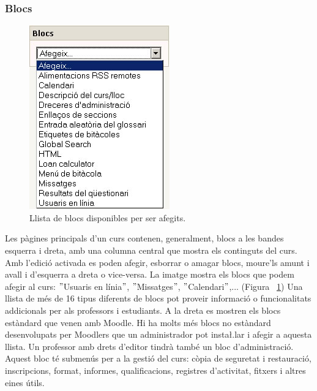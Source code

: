 \documentclass[a4paper]{report}  %
\begin{document}
\subsubsection{Blocs}
\begin{figure}[H] %
\begin{flushleft}
\includegraphics{img/MoodleBloc.jpg}
\caption[List caption]{Llista de blocs disponibles per ser afegits.} 
\label{fig:MoodleBloc} 
\end{flushleft}
\end{figure}
Les pàgines principals d'un curs contenen, generalment, blocs a les bandes esquerra i dreta, amb una columna central que mostra els continguts del curs. Amb l'edició activada es poden afegir, esborrar o amagar blocs, moure'ls amunt i avall i d'esquerra a dreta o vice-versa. La imatge mostra els blocs que podem afegir al curs: $"$Usuaris en línia$"$, $"$Missatges$"$, $"$Calendari$"$,... (Figura ~\ref{fig:MoodleBloc})
Una llista de més de 16 tipus diferents de blocs pot proveir informació o funcionalitats addicionals per als professors i estudiants. A la dreta es mostren els blocs estàndard que venen amb Moodle. Hi ha molts més blocs no estàndard desenvolupats per Moodlers que un administrador pot insta\l.lar i afegir a aquesta llista. 
Un professor amb drets d'editor tindrà també un bloc d'administració. Aquest bloc té submenús per a la gestió del curs: còpia de seguretat i restauració, inscripcions, format, informes, qualificacions, registres d'activitat, fitxers i altres eines útils. 
\end{document}
